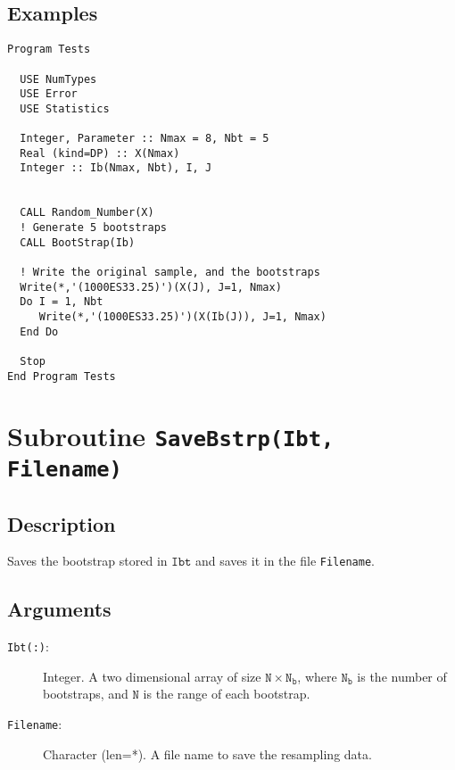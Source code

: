 \subsection{Examples}

\begin{lstlisting}[emph=Bootstrap,
                   emphstyle=\color{blue},
                   frame=trBL,
                   caption=Resampling some data.,
                   label=bootstrap]
Program Tests

  USE NumTypes
  USE Error
  USE Statistics

  Integer, Parameter :: Nmax = 8, Nbt = 5
  Real (kind=DP) :: X(Nmax)
  Integer :: Ib(Nmax, Nbt), I, J


  CALL Random_Number(X)
  ! Generate 5 bootstraps
  CALL BootStrap(Ib)

  ! Write the original sample, and the bootstraps
  Write(*,'(1000ES33.25)')(X(J), J=1, Nmax) 
  Do I = 1, Nbt
     Write(*,'(1000ES33.25)')(X(Ib(J)), J=1, Nmax) 
  End Do

  Stop
End Program Tests
\end{lstlisting}

\section{Subroutine \texttt{SaveBstrp(Ibt, Filename)}}

\subsection{Description}

Saves the bootstrap stored in $\mathtt{Ibt}$ and saves it in the file
\texttt{Filename}.

\subsection{Arguments}

\begin{description}
\item[\texttt{Ibt(:)}:] Integer. A two dimensional array of size
  $\mathtt{N\times N_b}$, where $\mathtt{N_b}$ is the number of
  bootstraps, and $\mathtt{N}$ is the range of each bootstrap.
\item[\texttt{Filename}: ] Character (len=*). A file name to save the
  resampling data.
\end{description}

